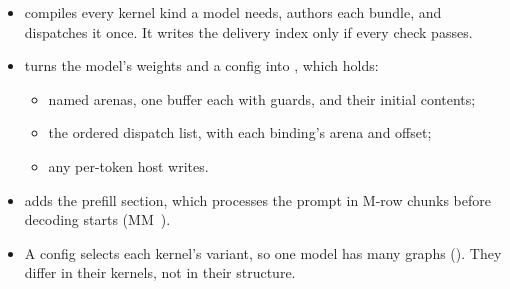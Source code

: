 \begin{itemize}
\item {} compiles every kernel kind a model needs, authors each bundle, and dispatches it once.
  It writes the delivery index only if every check passes.
\item {} turns the model's weights and a config into , which holds:

  \begin{itemize}
  \item named arenas, one buffer each with guards, and their initial contents;
  \item the ordered dispatch list, with each binding's arena and offset;
  \item any per-token host writes.
  \end{itemize}
\item {} adds the prefill section, which processes the prompt in M-row chunks before decoding
  starts (MM~).
\item A config selects each kernel's variant, so one model has many graphs (). They differ in their
  kernels, not in their structure.
\end{itemize}
